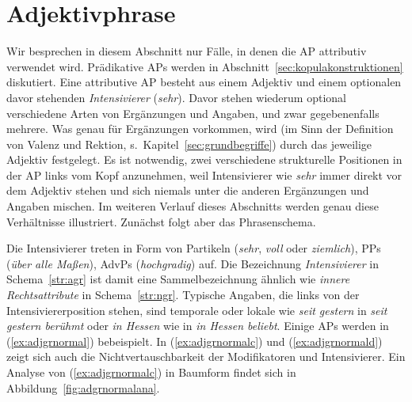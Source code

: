 \begin{exe}
  \ex\label{ex:grp9001}
  \begin{xlist}
  \end{xlist}
\end{exe}

\section{Adjektivphrase}

\label{sec:agr}

Wir besprechen in diesem Abschnitt nur Fälle, in denen die AP attributiv verwendet wird.
Prädikative APs werden in Abschnitt~\ref{sec:kopulakonstruktionen} diskutiert.
Eine attributive AP besteht aus einem Adjektiv und einem optionalen davor stehenden \textit{Intensivierer} (\zB \textit{sehr}).
Davor stehen wiederum optional verschiedene Arten von Ergänzungen und Angaben, und zwar gegebenenfalls mehrere. 
Was genau für Ergänzungen vorkommen, wird (im Sinn der Definition von Valenz und Rektion, s.\ Kapitel~\ref{sec:grundbegriffe}) durch das jeweilige Adjektiv festgelegt.
Es ist notwendig, zwei verschiedene strukturelle Positionen in der AP links vom Kopf anzunehmen, weil Intensivierer wie \textit{sehr} immer direkt vor dem Adjektiv stehen und sich niemals unter die anderen Ergänzungen und Angaben mischen.
Im weiteren Verlauf dieses Abschnitts werden genau diese Verhältnisse illustriert.
Zunächst folgt aber das Phrasenschema.



Die Intensivierer treten in Form von Partikeln (\zB \textit{sehr}, \textit{voll} oder \textit{ziemlich}), PPs (\zB \textit{über alle Maßen}), AdvPs (\zB \textit{hochgradig}) auf.
Die Bezeichnung \textit{Intensivierer} in Schema~\ref{str:agr} ist damit eine Sammelbezeichnung ähnlich wie \textit{innere Rechtsattribute} in Schema~\ref{str:ngr}.
Typische Angaben, die links von der Intensiviererposition stehen, sind \zB temporale oder lokale wie \textit{seit gestern} in \textit{seit gestern berühmt} oder \textit{in Hessen} wie in \textit{in Hessen beliebt}. 
Einige APs werden in (\ref{ex:adjgrnormal}) bebeispielt.
In (\ref{ex:adjgrnormalc}) und (\ref{ex:adjgrnormald}) zeigt sich auch die Nichtvertauschbarkeit der Modifikatoren und Intensivierer.
Ein Analyse von (\ref{ex:adjgrnormalc}) in Baumform findet sich in Abbildung~\ref{fig:adgrnormalana}.

